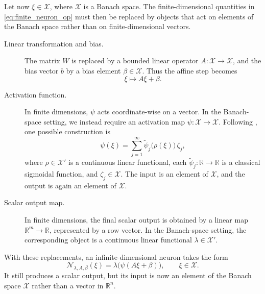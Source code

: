 %


Let now $\xi \in \mathcal{X}$, where $\mathcal{X}$ is a Banach space. The finite-dimensional quantities in \eqref{eq:finite_neuron_op} must then be replaced by objects that act on elements of the Banach space rather than on finite-dimensional vectors.

\begin{description}
    \item[Linear transformation and bias.]
    The matrix $W$ is replaced by a bounded linear operator
    $A : \mathcal{X} \to \mathcal{X}$, and the bias vector $b$
    by a bias element $\beta \in \mathcal{X}$. Thus the affine
    step becomes
    \[
        \xi \mapsto A\xi + \beta.
    \]

    \item[Activation function.]
    In finite dimensions, $\psi$ acts coordinate-wise on a vector.
    In the Banach-space setting, we instead require an activation
    map $\psi : \mathcal{X} \to \mathcal{X}$. Following
    \citet{Benth2024}, one possible construction is
    \begin{equation}
        \psi(\xi)
        =
        \sum_{j=1}^\infty
        \tilde{\psi}_j\bigl(\rho(\xi)\bigr)\,\zeta_j,
    \label{eq:inf_activation}
    \end{equation}
    where $\rho \in \mathcal{X}'$ is a continuous linear
    functional, each $\tilde{\psi}_j : \mathbb{R} \to \mathbb{R}$
    is a classical sigmoidal function, and
    $\zeta_j \in \mathcal{X}$. The input is an element of $\mathcal{X}$, and the output is again an element of $\mathcal{X}$.

    \item[Scalar output map.]
    In finite dimensions, the final scalar output is obtained by
    a linear map $\mathbb{R}^m \to \mathbb{R}$, represented by a
    row vector. In the Banach-space setting, the corresponding
    object is a continuous linear functional
    $\lambda \in \mathcal{X}'$. 
\end{description}

With these replacements, an infinite-dimensional neuron
\citep{Benth2024} takes the form
\begin{equation}
    \mathcal{N}_{\lambda, A, \beta}(\xi)
    =
    \lambda\bigl(\psi(A\xi + \beta)\bigr),
    \qquad \xi \in \mathcal{X}.
\label{eq:inf_neuron}
\end{equation}
It still produces a scalar output, but its input is now an element of the Banach space $\mathcal{X}$ rather than a vector in $\mathbb{R}^n$.

